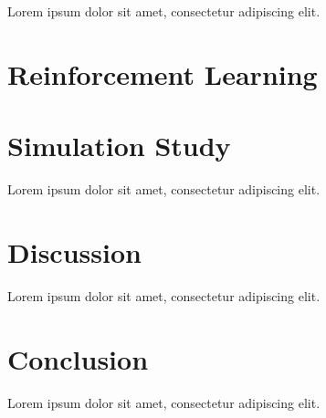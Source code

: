 \documentclass[final,5p,times,twocolumn]{elsarticle}
\begin{document}
Lorem ipsum dolor sit amet, consectetur adipiscing elit.

\section{Reinforcement Learning}
\label{sec:rl}

\section{Simulation Study}
\label{sec:sim}

Lorem ipsum dolor sit amet, consectetur adipiscing elit.

\section{Discussion}
\label{sec:disc}

Lorem ipsum dolor sit amet, consectetur adipiscing elit.

\section{Conclusion}
\label{sec:concl}

Lorem ipsum dolor sit amet, consectetur adipiscing elit.

 

\end{document}
